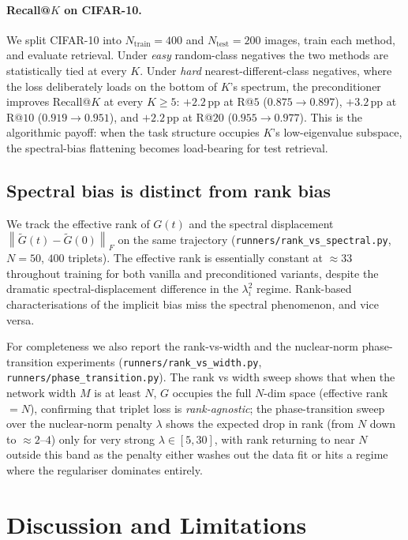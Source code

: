 \documentclass[11pt]{article}
\theoremstyle{definition}
\theoremstyle{plain}
\newcommand{\norm}[1]{\left\lVert#1\right\rVert}
\begin{document}
\paragraph{Recall@$K$ on CIFAR-10.}
We split CIFAR-10 into $N_{\mathrm{train}}=400$ and $N_{\mathrm{test}}=200$
images, train each method, and evaluate retrieval. Under \emph{easy}
random-class negatives the two methods are statistically tied at every $K$.
Under \emph{hard} nearest-different-class negatives, where the loss
deliberately loads on the bottom of $K$'s spectrum, the preconditioner
improves Recall@$K$ at every $K\ge 5$:
$+2.2$\,pp at R@$5$ ($0.875\to0.897$), $+3.2$\,pp at R@$10$
($0.919\to0.951$), and $+2.2$\,pp at R@$20$ ($0.955\to0.977$). This is the
algorithmic payoff: when the task structure occupies $K$'s low-eigenvalue
subspace, the spectral-bias flattening becomes load-bearing for test
retrieval.

\subsection{Spectral bias is distinct from rank bias}
\label{sec:rank-vs-spectral}

We track the effective rank of $G(t)$ and the spectral displacement
$\norm{\widetilde G(t)-\widetilde G(0)}_F$ on the same trajectory
(\texttt{runners/rank\_vs\_spectral.py}, $N=50$, $400$ triplets). The
effective rank is essentially constant at $\approx 33$ throughout training
for both vanilla and preconditioned variants, despite the dramatic
spectral-displacement difference in the $\lambda_i^2$ regime. Rank-based
characterisations of the implicit bias miss the spectral phenomenon, and
vice versa.

For completeness we also report the rank-vs-width and the
nuclear-norm phase-transition experiments (\texttt{runners/rank\_vs\_width.py},
\texttt{runners/phase\_transition.py}). The rank vs width sweep shows that
when the network width $M$ is at least $N$, $G$ occupies the full
$N$-dim space (effective rank $=N$), confirming that triplet loss is
\emph{rank-agnostic}; the phase-transition sweep over the nuclear-norm
penalty $\lambda$ shows the expected drop in rank (from $N$ down to
$\approx 2$--$4$) only for very strong $\lambda\in[5,30]$, with rank
returning to near $N$ outside this band as the penalty either washes out the
data fit or hits a regime where the regulariser dominates entirely.

\section{Discussion and Limitations}
\label{sec:discussion}
\end{document}
